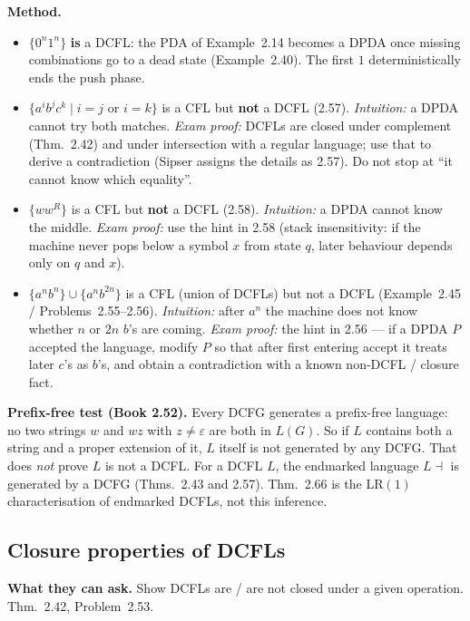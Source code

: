 \documentclass[11pt,a4paper]{article}
\newcommand{\eps}{\varepsilon}
\begin{document}
\textbf{Method.}
\begin{itemize}
  \item $\{0^n1^n\}$ \textbf{is} a DCFL: the PDA of
        Example~2.14 becomes a DPDA once missing combinations go
        to a dead state (Example~2.40). The first $1$
        deterministically ends the push phase.
  \item $\{a^ib^jc^k\mid i=j\text{ or }i=k\}$ is a CFL but
        \textbf{not} a DCFL (2.57). \emph{Intuition:} a DPDA
        cannot try both matches. \emph{Exam proof:} DCFLs are
        closed under complement (Thm.~2.42) and under intersection
        with a regular language; use that to derive a
        contradiction (Sipser assigns the details as 2.57). Do
        not stop at ``it cannot know which equality''.
  \item $\{ww^R\}$ is a CFL but \textbf{not} a DCFL (2.58).
        \emph{Intuition:} a DPDA cannot know the middle.
        \emph{Exam proof:} use the hint in 2.58 (stack
        insensitivity: if the machine never pops below a symbol
        $x$ from state $q$, later behaviour depends only on $q$
        and $x$).
  \item $\{a^nb^n\}\cup\{a^nb^{2n}\}$ is a CFL (union of DCFLs)
        but not a DCFL (Example~2.45 / Problems~2.55--2.56).
        \emph{Intuition:} after $a^n$ the machine does not know
        whether $n$ or $2n$ $b$'s are coming. \emph{Exam proof:}
        the hint in 2.56 --- if a DPDA $P$ accepted the language,
        modify $P$ so that after first entering accept it treats
        later $c$'s as $b$'s, and obtain a contradiction with a
        known non-DCFL / closure fact.
\end{itemize}

\textbf{Prefix-free test (Book 2.52).}
Every DCFG generates a prefix-free language: no two strings
$w$ and $wz$ with $z\neq\eps$ are both in $L(G)$. So if $L$
contains both a string and a proper extension of it, $L$ itself
is not generated by any DCFG. That does \emph{not} prove $L$ is
not a DCFL. For a DCFL $L$, the endmarked language $L\dashv$ is
generated by a DCFG (Thms.~2.43 and 2.57). Thm.~2.66 is the
LR$(1)$ characterisation of endmarked DCFLs, not this inference.

\subsection{Closure properties of DCFLs}

\textbf{What they can ask.}
Show DCFLs are / are not closed under a given operation.
Thm.~2.42, Problem~2.53.
\end{document}
